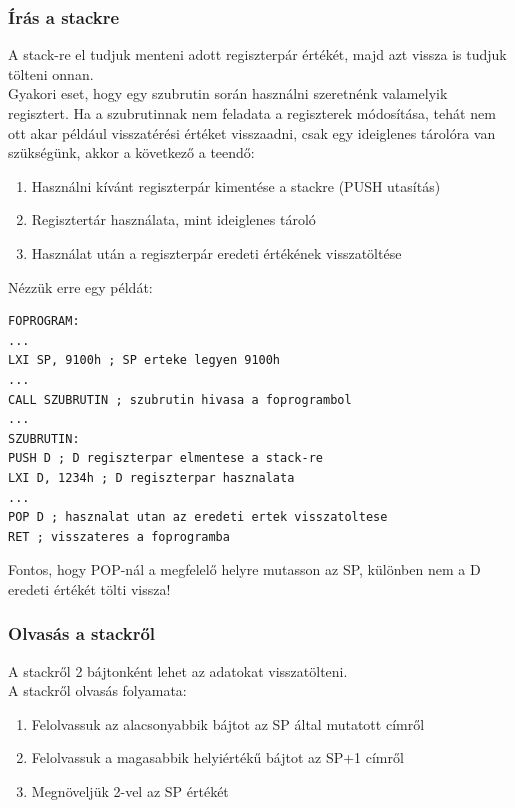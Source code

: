 \documentclass{article}
\begin{document}
\subsubsection{Írás a stackre}
A stack-re el tudjuk menteni adott regiszterpár értékét, majd azt vissza is tudjuk tölteni onnan. \\
Gyakori eset, hogy egy szubrutin során használni szeretnénk valamelyik regisztert. Ha a szubrutinnak nem feladata a regiszterek módosítása, tehát nem ott akar például visszatérési értéket visszaadni, csak egy ideiglenes tárolóra van szükségünk, akkor a következő a teendő:
\begin{enumerate}
	\item Használni kívánt regiszterpár kimentése a stackre (PUSH utasítás)
	\item Regisztertár használata, mint ideiglenes tároló
	\item Használat után a regiszterpár eredeti értékének visszatöltése
\end{enumerate}
Nézzük erre egy példát:
\begin{lstlisting}[frame=single]
FOPROGRAM:
...
LXI SP, 9100h ; SP erteke legyen 9100h
...
CALL SZUBRUTIN ; szubrutin hivasa a foprogrambol
...
SZUBRUTIN:
PUSH D ; D regiszterpar elmentese a stack-re
LXI D, 1234h ; D regiszterpar hasznalata
...
POP D ; hasznalat utan az eredeti ertek visszatoltese
RET ; visszateres a foprogramba
\end{lstlisting}
\colorbox{orange!30}{Fontos, hogy POP-nál a megfelelő helyre mutasson az SP, különben nem a D eredeti értékét tölti vissza!}

\subsubsection{Olvasás a stackről}
A stackről 2 bájtonként lehet az adatokat visszatölteni. \\
A stackről olvasás folyamata:
\begin{enumerate}
	\item Felolvassuk az alacsonyabbik bájtot az SP által mutatott címről
	\item Felolvassuk a magasabbik helyiértékű bájtot az SP+1 címről
	\item Megnöveljük 2-vel az SP értékét
\end{enumerate}
\end{document}
